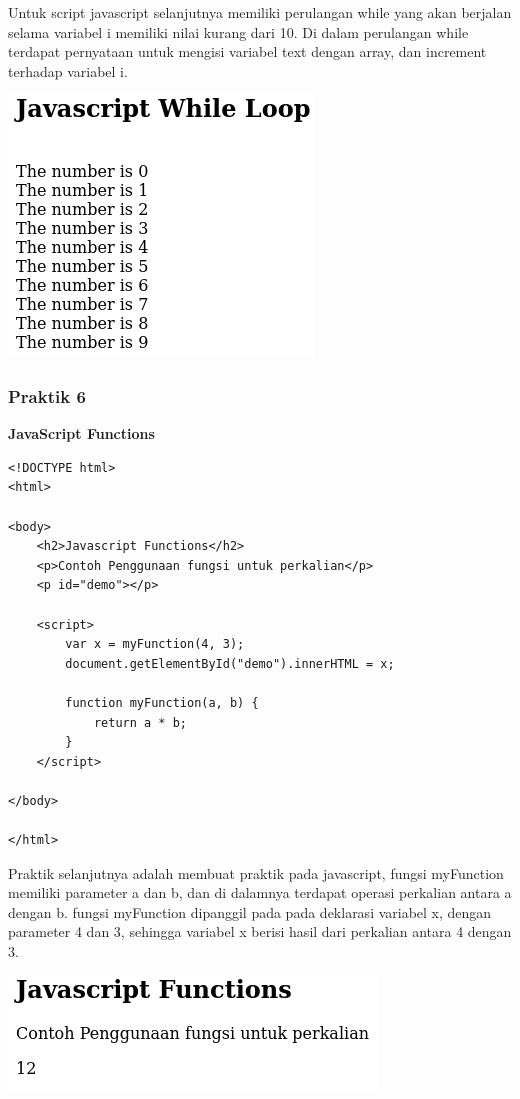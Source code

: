 \documentclass[a4paper,12pt]{article}
\begin{document}
Untuk script javascript selanjutnya memiliki perulangan while yang akan berjalan selama variabel i memiliki nilai kurang
dari 10. Di dalam perulangan while terdapat pernyataan untuk mengisi variabel text dengan array, dan increment terhadap
variabel i.

\begin{center}
    \includegraphics[scale=.7]{5.png} 
\end{center}

\subsubsection{Praktik 6}
\textbf{JavaScript Functions\\}
\begin{lstlisting}
<!DOCTYPE html>
<html>

<body>
    <h2>Javascript Functions</h2>
    <p>Contoh Penggunaan fungsi untuk perkalian</p>
    <p id="demo"></p>

    <script>
        var x = myFunction(4, 3);
        document.getElementById("demo").innerHTML = x;

        function myFunction(a, b) {
            return a * b;
        }
    </script>

</body>

</html>
\end{lstlisting}

Praktik selanjutnya adalah membuat praktik pada javascript, fungsi myFunction memiliki parameter a dan b, dan di
dalamnya terdapat operasi perkalian antara a dengan b. fungsi myFunction dipanggil pada pada deklarasi variabel x,
dengan parameter 4 dan 3, sehingga variabel x berisi hasil dari perkalian antara 4 dengan 3.

\begin{center}
    \includegraphics[scale=.7]{6.png} 
\end{center}
\end{document}
